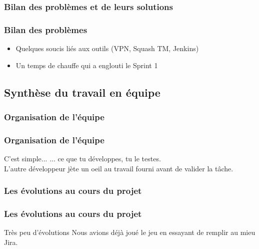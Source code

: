 \documentclass{beamer}
\begin{document}
      \subsubsection{Bilan des problèmes et de leurs solutions}
      \begin{frame}
        \frametitle{Bilan des problèmes}
        \begin{block}{}
          \begin{itemize}
            \item Quelques soucis liés aux outils (VPN, Squash TM, Jenkins)
            \item Un temps de chauffe qui a englouti le Sprint 1
          \end{itemize}
        \end{block}
      \end{frame}
      
    \subsection{Synthèse du travail en équipe}
      
      \subsubsection{Organisation de l'équipe}
      \begin{frame}
        \frametitle{Organisation de l'équipe}
        \begin{block}{C'est simple...}
          ... ce que tu développes, tu le testes.\\
          L'autre développeur jète un oeil au travail fourni avant de valider la tâche.
        \end{block}
      \end{frame}
      
      \subsubsection{Les évolutions au cours du projet}
      \begin{frame}
        \frametitle{Les évolutions au cours du projet}
        \begin{block}{Très peu d'évolutions}
          Nous avions déjà joué le jeu en essayant de remplir au mieu Jira.\\
        \end{block}
      \end{frame}
      
\end{document}
